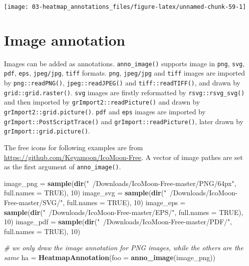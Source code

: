 \documentclass[]{book}
\newenvironment{Shaded}{\begin{snugshade}}{\end{snugshade}}
\newcommand{\KeywordTok}[1]{\textcolor[rgb]{0.13,0.29,0.53}{\textbf{#1}}}
\newcommand{\DataTypeTok}[1]{\textcolor[rgb]{0.13,0.29,0.53}{#1}}
\newcommand{\DecValTok}[1]{\textcolor[rgb]{0.00,0.00,0.81}{#1}}
\newcommand{\StringTok}[1]{\textcolor[rgb]{0.31,0.60,0.02}{#1}}
\newcommand{\CommentTok}[1]{\textcolor[rgb]{0.56,0.35,0.01}{\textit{#1}}}
\newcommand{\OtherTok}[1]{\textcolor[rgb]{0.56,0.35,0.01}{#1}}
\newcommand{\NormalTok}[1]{#1}
\theoremstyle{definition}
\theoremstyle{definition}
\theoremstyle{definition}
\theoremstyle{remark}
\begin{document}
\begin{center}\texttt{[image: 03-heatmap\_annotations\_files/figure-latex/unnamed-chunk-59-1]} \end{center}

\section{Image annotation}\label{image-annotation}

Images can be added as annotations. \texttt{anno\_image()} supports
image in \texttt{png}, \texttt{svg}, \texttt{pdf}, \texttt{eps},
\texttt{jpeg/jpg}, \texttt{tiff} formats. \texttt{png},
\texttt{jpeg/jpg} and \texttt{tiff} images are imported by
\texttt{png::readPNG()}, \texttt{jpeg::readJPEG()} and
\texttt{tiff::readTIFF()}, and drawn by \texttt{grid::grid.raster()}.
\texttt{svg} images are firstly reformatted by
\texttt{rsvg::rsvg\_svg()} and then imported by
\texttt{grImport2::readPicture()} and drawn by
\texttt{grImport2::grid.picture()}. \texttt{pdf} and \texttt{eps} images
are imported by \texttt{grImport::PostScriptTrace()} and
\texttt{grImport::readPicture()}, later drawn by
\texttt{grImport::grid.picture()}.

The free icons for following examples are from
\url{https://github.com/Keyamoon/IcoMoon-Free}. A vector of image pathes
are set as the first argument of \texttt{anno\_image()}.

\begin{Shaded}
\begin{Highlighting}[]
\NormalTok{image_png =}\StringTok{ }\KeywordTok{sample}\NormalTok{(}\KeywordTok{dir}\NormalTok{(}\StringTok{"~/Downloads/IcoMoon-Free-master/PNG/64px"}\NormalTok{, }\DataTypeTok{full.names =} \OtherTok{TRUE}\NormalTok{), }\DecValTok{10}\NormalTok{)}
\NormalTok{image_svg =}\StringTok{ }\KeywordTok{sample}\NormalTok{(}\KeywordTok{dir}\NormalTok{(}\StringTok{"~/Downloads/IcoMoon-Free-master/SVG/"}\NormalTok{, }\DataTypeTok{full.names =} \OtherTok{TRUE}\NormalTok{), }\DecValTok{10}\NormalTok{)}
\NormalTok{image_eps =}\StringTok{ }\KeywordTok{sample}\NormalTok{(}\KeywordTok{dir}\NormalTok{(}\StringTok{"~/Downloads/IcoMoon-Free-master/EPS/"}\NormalTok{, }\DataTypeTok{full.names =} \OtherTok{TRUE}\NormalTok{), }\DecValTok{10}\NormalTok{)}
\NormalTok{image_pdf =}\StringTok{ }\KeywordTok{sample}\NormalTok{(}\KeywordTok{dir}\NormalTok{(}\StringTok{"~/Downloads/IcoMoon-Free-master/PDF/"}\NormalTok{, }\DataTypeTok{full.names =} \OtherTok{TRUE}\NormalTok{), }\DecValTok{10}\NormalTok{)}

\CommentTok{# we only draw the image annotation for PNG images, while the others are the same}
\NormalTok{ha =}\StringTok{ }\KeywordTok{HeatmapAnnotation}\NormalTok{(}\DataTypeTok{foo =} \KeywordTok{anno_image}\NormalTok{(image_png))}
\end{Highlighting}
\end{Shaded}
\end{document}
